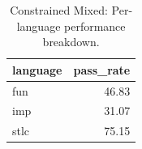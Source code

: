 \begin{table}[htbp]
  \centering
  \caption{Constrained Mixed: Per-language performance breakdown.}
  \label{tab:lang_breakdown_constrained_mixed}
  \begin{tabular}{lr}
    \toprule
    language & pass\_rate \\
    \midrule
    fun & 46.83 \\
    imp & 31.07 \\
    stlc & 75.15 \\
    \bottomrule
  \end{tabular}
\end{table}